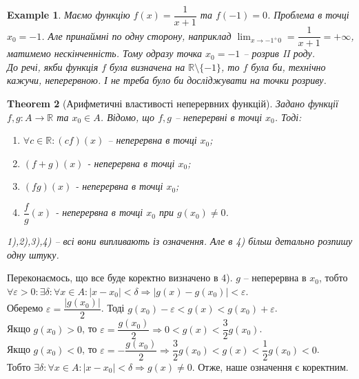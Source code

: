 \documentclass[a4paper, 14pt]{article}
\theoremstyle{theoremdd}
\newtheorem{theorem}{Theorem}[subsection]
\theoremstyle{theoremdd}
\theoremstyle{theoremdd}
\theoremstyle{theoremdd}
\newtheorem{example}[theorem]{Example}
\theoremstyle{theoremdd}
\theoremstyle{theoremdd}
\theoremstyle{theoremdd}
\theoremstyle{theoremdd}
\begin{document}
\begin{example} Маємо функцію $f(x) = \dfrac{1}{x+1}$ та $f(-1) = 0$. Проблема в точці $x_0 = -1$. Але принаймні по одну сторону, наприклад $\displaystyle \lim_{x \to -1^+0} =\dfrac{1}{x+1} = +\infty$, матимемо нескінченність. Тому одразу точка $x_0 = -1$ -- розрив II роду.\\
До речі, якби функція $f$ була визначена на $\mathbb{R} \setminus \{-1\}$, то $f$ була би, технічно кажучи, неперервною. І не треба було би досліджувати на точки розриву.
\\ %
\end{example}

\begin{theorem}[Арифметичні властивості неперервних функцій]
Задано функції $f,g \colon A \to \mathbb{R}$ та $x_0 \in A$. Відомо, що $f,g$ -- неперервні в точці $x_0$. Тоді:
\begin{enumerate}[nosep,wide=0pt,label={\arabic*)}]
\item $\forall c \in \mathbb{R}: (cf)(x)$ -- неперервна в точці $x_0$;
\item $(f+g)(x)$ - неперервна в точці $x_0$;
\item $(fg)(x)$ - неперервна в точці $x_0$;
\item $\dfrac{f}{g}(x)$ - неперервна в точці $x_0$ при $g(x_0) \neq 0$.
\end{enumerate}
\textit{1),2),3),4) -- всі вони випливають із означення. Але в 4) більш детально розпишу одну штуку.}
\end{theorem}
Переконаємось, що все буде коректно визначено в 4).
$g$ -- неперервна в $x_0$, тобто $\forall \varepsilon > 0: \exists \delta: \forall x \in A: |x-x_0|<\delta \Rightarrow |g(x)-g(x_0)|<\varepsilon$.\\
Оберемо $\varepsilon = \dfrac{|g(x_0)|}{2}$. Тоді $g(x_0)-\varepsilon <g(x) <g(x_0)+\varepsilon$.\\
Якщо $g(x_0) > 0$, то $\varepsilon = \dfrac{g(x_0)}{2} \Rightarrow 0 < g(x) < \dfrac{3}{2}g(x_0)$.\\
Якщо $g(x_0) < 0$, то $\varepsilon = -\dfrac{g(x_0)}{2} \Rightarrow \dfrac{3}{2}g(x_0) < g(x) < \dfrac{1}{2}g(x_0) < 0$.\\
Тобто $\exists \delta: \forall x \in A: |x-x_0|<\delta \Rightarrow g(x) \neq 0$. Отже, наше означення є коректним.
\end{document}
